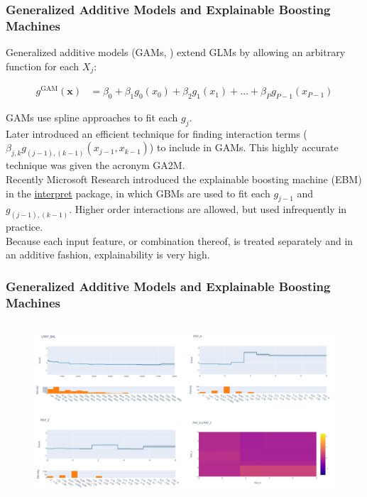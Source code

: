 \documentclass[11pt,aspectratio=169,hyperref={colorlinks}]{beamer}
\begin{document}
	\begin{frame}
		
		\frametitle{Generalized Additive Models and Explainable Boosting Machines}
		
		\small
		
		Generalized additive models (GAMs, \cite{esl}) extend GLMs by allowing an arbitrary function for each $X_j$: 	
		
		\begin{equation}
			\begin{aligned}\label{eq:gam}
			g^{\text{GAM}}(\mathbf{x}) &= \beta_0 + \beta_1 g_0(x_0) + \beta_2 g_1(x_1) + \dots + \beta_P g_{P-1}(x_{P-1})
			\end{aligned}
		\end{equation}	
		
		GAMs use spline approaches to fit each $g_j$.\\
		\vspace{10pt}
		Later \cite{ga2m} introduced an efficient technique for finding interaction terms ($\beta_{j,k} g_{(j-1),(k-1)}(x_{j-1}, x_{k-1})$) to include in GAMs. This highly accurate technique was given the acronym GA2M.\\
		\vspace{10pt}
		Recently Microsoft Research introduced the explainable boosting machine (EBM) in the \href{https://github.com/interpretml/interpret/}{interpret} package, in which GBMs are used to fit each $g_{j-1}$ and $g_{(j-1),(k-1)}$. Higher order interactions are allowed, but used infrequently in practice. \\
		\vspace{10pt}
		Because each input feature, or combination thereof, is treated separately and in an additive fashion, explainability is very high. 
		
	\end{frame}

	\begin{frame}
	
		\frametitle{Generalized Additive Models and Explainable Boosting Machines}
		
		\begin{figure}[htb]
			\begin{center}
				\includegraphics[height=190pt]{../img/ebm.png}
				\label{fig:ebm}
			\end{center}
		\end{figure}
	
	\end{frame}
\end{document}
